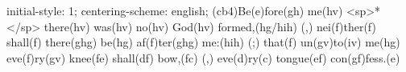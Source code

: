 initial-style: 1;
centering-scheme: english;
(cb4)Be(e)fore(gh) me(hv) <sp>*</sp> there(hv) was(hv) no(hv) God(hv) formed,(hg/hih) (,) nei(f)ther(f) shall(f) there(ghg) be(hg) af(f)ter(ghg) me:(hih) (;) that(f) un(gv)to(iv) me(hg) eve(f)ry(gv) knee(fe) shall(df) bow,(fc) (,) eve(d)ry(c) tongue(ef) con(gf)fess.(e)
